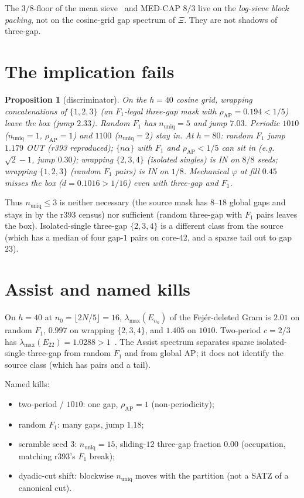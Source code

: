 \documentclass[11pt]{article}
\newtheorem{prop}{Proposition}
\theoremstyle{remark}
\begin{document}
The $3/8$-floor of the mean sieve~\cite{r361} and MED-CAP
$8/3$ live on the \emph{log-sieve block packing}, not on the
cosine-grid gap spectrum of $\Xi$.  They are not shadows of
three-gap.

\section{The implication fails}\label{sec:disc}

\begin{prop}[discriminator]\label{prop:disc}
On the $h=40$ cosine grid, wrapping concatenations of
$\{1,2,3\}$ (an $F_1$-legal three-gap mask with
$\rho_{\mathrm{AP}}=0.194<1/5$) leave the box
(jump $2.33$).  Random $F_1$ has $n_{\mathrm{uniq}}=5$ and
jump $7.03$.  Periodic $1010$ ($n_{\mathrm{uniq}}=1$,
$\rho_{\mathrm{AP}}=1$) and $1100$ ($n_{\mathrm{uniq}}=2$)
stay in.
At $h=80$: random $F_1$ jump $1.179$ OUT (r393 reproduced);
$\{n\alpha\}$ with $F_1$ and $\rho_{\mathrm{AP}}<1/5$ can sit
in (e.g.\ $\sqrt{2}-1$, jump $0.30$);
wrapping $\{2,3,4\}$ (isolated singles) is IN on $8/8$ seeds;
wrapping $\{1,2,3\}$ (random $F_1$ pairs) is IN on $1/8$.  Mechanical $\varphi$ at fill $0.45$ misses the box
($d=0.1016>1/16$) even with three-gap and $F_1$.
\end{prop}

Thus $n_{\mathrm{uniq}}\le 3$ is neither necessary (the source
mask has $8$--$18$ global gaps and stays in by the r393 census)
nor sufficient (random three-gap with $F_1$ pairs leaves the
box).  Isolated-single three-gap $\{2,3,4\}$ is a different
class from the source (which has a median of four gap-$1$
pairs on core-$42$, and a sparse tail out to gap $23$).

\section{Assist and named kills}\label{sec:kills}

On $h=40$ at $n_0=\lfloor 2N/5\rfloor=16$,
$\lambda_{\max}(E_{n_0})$ of the Fej\'er-deleted Gram is
$2.01$ on random $F_1$, $0.997$ on wrapping $\{2,3,4\}$, and
$1.405$ on $1010$.  Two-period $c=2/3$ has
$\lambda_{\max}(E_{22})=1.0288>1$~\cite{r387,r394}.
The Assist spectrum separates sparse isolated-single
three-gap from random $F_1$ and from global AP; it does not
identify the source class (which has pairs and a tail).

Named kills:
\begin{itemize}
\item two-period / $1010$: one gap, $\rho_{\mathrm{AP}}=1$
(non-periodicity);
\item random $F_1$: many gaps, jump $1.18$;
\item scramble seed $3$: $n_{\mathrm{uniq}}=15$, sliding-$12$
three-gap fraction $0.00$ (occupation, matching r393's $F_1$
break);
\item dyadic-cut shift: blockwise $n_{\mathrm{uniq}}$ moves
with the partition (not a SATZ of a canonical cut).
\end{itemize}
\end{document}
